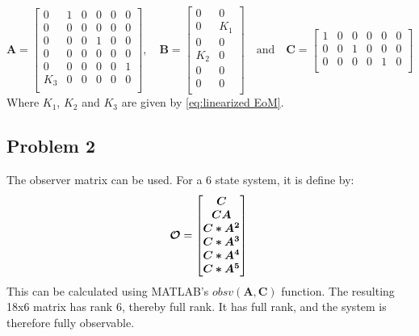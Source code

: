 \begin{equation}
  \label{eq:state_space_A_B_C}
  \bm{A} =
  \begin{bmatrix}
    0 & 1 & 0 & 0 & 0 & 0 \\
    0 & 0 & 0 & 0 & 0 & 0 \\
    0 & 0 & 0 & 1 & 0 & 0 \\
    0 & 0 & 0 & 0 & 0 & 0 \\
    0 & 0 & 0 & 0 & 0 & 1 \\
    K_3 & 0 & 0 & 0 & 0 & 0 \\
  \end{bmatrix}
  , \quad \bm{B} =
  \begin{bmatrix}
    0 & 0 \\
    0 & K_1 \\
    0 & 0 \\
    K_2 & 0 \\
    0 & 0 \\
    0 & 0 \\
  \end{bmatrix}
  \quad \text{and} \quad \bm{C} =
  \begin{bmatrix}
    1 & 0 & 0 & 0 & 0 & 0 \\
    0 & 0 & 1 & 0 & 0 & 0 \\
    0 & 0 & 0 & 0 & 1 & 0 \\
  \end{bmatrix}
\end{equation}
%
Where $K_1$, $K_2$ and $K_3$ are given by \cref{eq:linearized EoM}.
%
\subsection{Problem 2}
The observer matrix can be used. For a 6 state system, it is define by:
\begin{equation}
  \bm{\mathcal{O}} =
  \begin{bmatrix}
    \bm{C} \\
    \bm{CA} \\
    \bm{C*A^2} \\
    \bm{C*A^3} \\
    \bm{C*A^4} \\
    \bm{C*A^5} \\
  \end{bmatrix} \\
\end{equation}
This can be calculated using MATLAB's $obsv(\bm{A},\bm{C})$
function. The resulting 18x6 matrix has rank 6, thereby full rank.
%
It has full rank, and the system is therefore fully observable.

